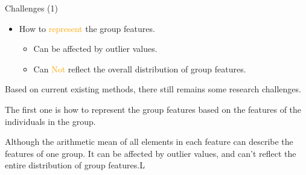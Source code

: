 \documentclass[
size=14pt,
paper=smartboard,  %
mode=present, 		%
display=slides, 	%
style=tuliplab,  	%
pauseslide,
fleqn,leqno]{powerdot}
\begin{document}
	
	\begin{slide}{Challenges (1)}
		\begin{itemize}
			\item
			How to \textcolor{orange}{represent} the group features.
			
			\begin{itemize}
				\item
				Can be affected by outlier values.
				
				\item
				Can \textcolor{orange}{Not} reflect the overall distribution of group features.
			\end{itemize}
		\end{itemize}
		
		\begin{note}
			Based on current existing methods,
			there still remains some research challenges.
			
			The first one is how to represent the group features
			based on the features of the individuals in the group.
			
			Although the arithmetic mean of all elements
			in each feature can describe the features of one group.
			It can be affected by outlier values,
			and can't reflect the entire distribution of group features.L
		\end{note}
		
	\end{slide}
	
\end{document}

